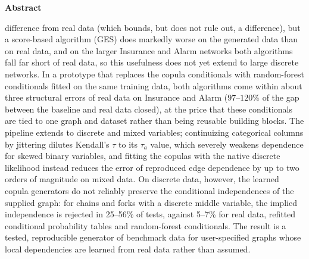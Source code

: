 \documentclass[
  english,
  class=report,
  accentcolor=2c,
  marginpar=false,
  parskip=half-,
  fontsize=11pt,
  ruledheaders=false,
  pdfa=false,
  IMRAD=false,
  thesis={type=master}
]{tudapub}
\newenvironment{centeredabstract}[1][Abstract]{%
  \clearpage
  \thispagestyle{empty}
  \begin{center}
    {\Large \bfseries #1}\\[1em]
    \begin{minipage}{0.8\textwidth}
      \normalsize
}{%
    \end{minipage}
  \end{center}
  \clearpage
}
\begin{document}
\begin{centeredabstract}
difference from real data (which bounds, but does not rule out, a
difference), but a score-based algorithm (GES) does markedly worse on the
generated data than on real data, and on the larger Insurance and Alarm
networks both algorithms fall far short of real data, so this usefulness
does not yet extend to large discrete networks. In a prototype that
replaces the copula conditionals with random-forest conditionals fitted on
the same training data, both algorithms come within about three
structural errors of real data on Insurance and Alarm ($97$--$120\%$ of
the gap between the baseline and real data closed), at the price that these conditionals are
tied to one graph and dataset rather than being reusable building blocks. The
pipeline extends to discrete and mixed variables; continuizing categorical
columns by jittering dilutes Kendall's $\tau$ to its $\tau_a$ value, which
severely weakens dependence for skewed binary variables, and fitting the
copulas with the native discrete likelihood instead reduces the error of
reproduced edge dependence by up to two orders of magnitude on mixed data.
On discrete data, however, the learned copula generators do not reliably preserve
the conditional independences of the supplied graph: for chains and forks
with a discrete middle variable, the implied independence is rejected in
25--56\% of tests, against 5--7\% for real data, refitted conditional
probability tables and random-forest conditionals.
The result is a tested, reproducible generator of benchmark data for
user-specified graphs whose local dependencies are learned from real
data rather than assumed.
\end{centeredabstract}
\end{document}

